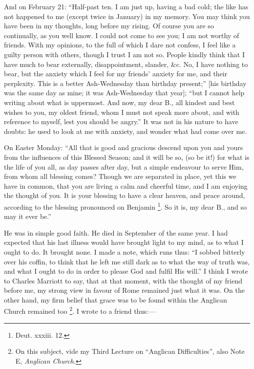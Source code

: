 And on February 21: ``Half-past ten. I am just up, having a bad
cold; the like has not happened to me (except twice in January) in my
memory. You may think you have been in my thoughts, long before my
rising. Of course you are so continually, as you well know. I could not
come to see you; I am not worthy of friends. With my opinions, to the
full of which I dare not confess, I feel like a guilty person with
others, though I trust I am not so. People kindly think that I have much
to bear externally, disappointment, slander, \&c. No, I have nothing
to bear, but the anxiety which I feel for my friends' anxiety for me,
and their perplexity. This is a better Ash-Wednesday than
birthday present;'' [his birthday was the same day as mine; it was
Ash-Wednesday that year]; ``but I cannot help writing
about what is uppermost. And now, my dear B., all kindest and
best wishes to you, my oldest friend, whom I must not speak more about,
and with reference to myself, lest you should be angry.'' It was not
in his nature to have doubts: he used to look at me with anxiety, and
wonder what had come over me.

On Easter Monday: ``All that is good and gracious descend upon
you and yours from the influences of this Blessed Season; and it will be
so, (so be it!) for what is the life of you all, as day passes after
day, but a simple endeavour to serve Him, from whom all blessing comes?
Though we are separated in place, yet this we have in common, that you
are living a calm and cheerful time, and I am enjoying the thought of
you. It is your blessing to have a clear heaven, and peace around,
according to the blessing pronounced on Benjamin \footnote{Deut. xxxiii. 12.}. So
it is, my dear B., and so may it ever be.''

He was in simple good faith. He died in September of the same year. I had expected that his last illness would have brought light to
my mind, as to what I ought to do. It brought none. I made a note, which
runs thus: ``I sobbed bitterly over his coffin, to think that he
left me still dark as to what the way of truth was, and what I ought to
do in order to please God and fulfil His will.'' I think I wrote to
Charles Marriott to say, that at that moment, with the thought of
my friend before me, my strong view in favour of Rome remained just what
it was. On the other hand, my firm belief that grace was to be found within the Anglican Church remained too \footnote{On this subject, vide my Third Lecture on
``Anglican Difficulties'', also Note E, \emph{Anglican Church}.}. I wrote to a
friend thus:—

